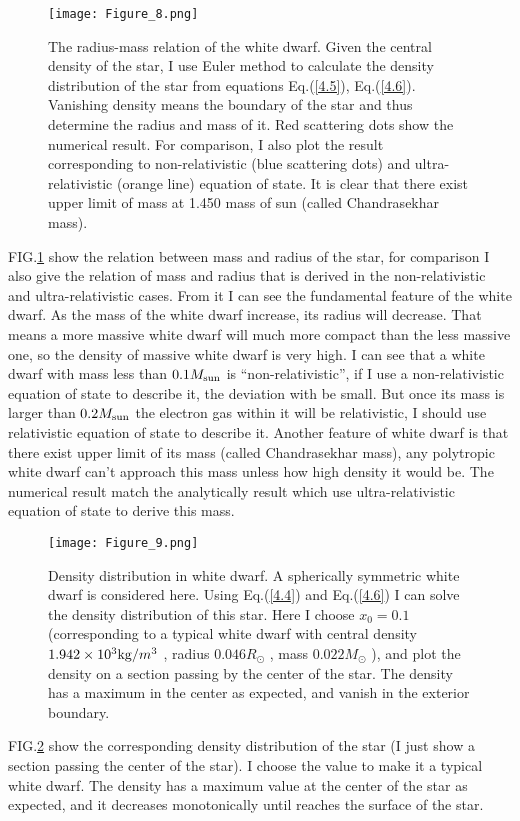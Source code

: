 \documentclass[preprint]{revtex4-1}
\begin{document}
\begin{figure}
	\centering   
	\texttt{[image: Figure\_8.png]}  
	\caption{The radius-mass relation of the white dwarf. Given the central density of the star, I use Euler method to calculate the density distribution of the star from equations Eq.(\ref{4.5}), Eq.(\ref{4.6}). Vanishing density means the boundary of the star and thus determine the radius and mass of it. Red scattering dots show the numerical result. For comparison, I also plot the result corresponding to non-relativistic (blue scattering dots) and ultra-relativistic (orange line) equation of state. It is clear that there exist upper limit of mass at 1.450 mass of sun (called Chandrasekhar mass).} 
	\label{fig:8} 
\end{figure}
FIG.\ref{fig:8} show the relation between mass and radius of the star, for comparison I also give the relation of mass and radius that is derived in the non-relativistic and ultra-relativistic cases. From it I can see the fundamental feature of the white dwarf. As the mass of the white dwarf increase, its radius will decrease. That means a more massive white dwarf will much more compact than the less massive one, so the density of massive white dwarf is very high. I can see that a white dwarf with mass less than $0.1{M_{{\mathop{\rm sun}\nolimits} }}$ is “non-relativistic”, if I use a non-relativistic equation of state to describe it, the deviation with be small. But once its mass is larger than $0.2{M_{{\mathop{\rm sun}\nolimits} }}$  the electron gas within it will be relativistic, I should use relativistic equation of state to describe it. Another feature of white dwarf is that there exist upper limit of its mass (called Chandrasekhar mass), any polytropic white dwarf can’t approach this mass unless how high density it would be. The numerical result match the analytically result which use ultra-relativistic equation of state to derive this mass.\par
\begin{figure}
	\centering   
	\texttt{[image: Figure\_9.png]}  
	\caption{Density distribution in white dwarf. A spherically symmetric white dwarf is considered here. Using Eq.(\ref{4.4}) and Eq.(\ref{4.6}) I can solve the density distribution of this star. Here I choose $x_0=0.1$ (corresponding to a typical white dwarf with central density $1.942 \times {10^3}{\mathop{\rm kg}\nolimits} /{m^3}$ , radius $0.046 R_{\odot}$ , mass $0.022M_{\odot}$ ), and plot the density on a section passing by the center of the star. The density has a maximum in the center as expected, and vanish in the exterior boundary.} 
	\label{fig:9} 
\end{figure}
FIG.\ref{fig:9} show the corresponding density distribution of the star (I just show a section passing the center of the star). I choose the value to make it a typical white dwarf. The density has a maximum value at the center of the star as expected, and it decreases monotonically until reaches the surface of the star.
\end{document}
